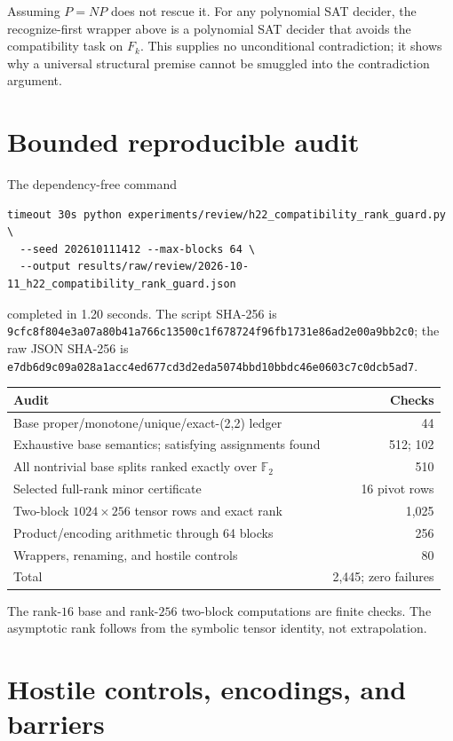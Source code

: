 \documentclass[11pt]{article}
\begin{document}
Assuming $P=NP$ does not rescue it.  For any polynomial SAT decider, the
recognize-first wrapper above is a polynomial SAT decider that avoids the
compatibility task on $F_k$.  This supplies no unconditional contradiction;
it shows why a universal structural premise cannot be smuggled into the
contradiction argument.

\section{Bounded reproducible audit}

The dependency-free command
\begin{verbatim}
timeout 30s python experiments/review/h22_compatibility_rank_guard.py \
  --seed 202610111412 --max-blocks 64 \
  --output results/raw/review/2026-10-11_h22_compatibility_rank_guard.json
\end{verbatim}
completed in 1.20 seconds.  The script SHA-256 is
\nolinkurl{9cfc8f804e3a07a80b41a766c13500c1f678724f96fb1731e86ad2e00a9bb2c0};
the raw JSON SHA-256 is
\nolinkurl{e7db6d9c09a028a1acc4ed677cd3d2eda5074bbd10bbdc46e0603c7c0dcb5ad7}.

\begin{center}
\begin{tabular}{@{}lr@{}}
\toprule
Audit & Checks\\
\midrule
Base proper/monotone/unique/exact-(2,2) ledger & 44\\
Exhaustive base semantics; satisfying assignments found & 512; 102\\
All nontrivial base splits ranked exactly over $\mathbb F_2$ & 510\\
Selected full-rank minor certificate & 16 pivot rows\\
Two-block $1024\times256$ tensor rows and exact rank & 1,025\\
Product/encoding arithmetic through 64 blocks & 256\\
Wrappers, renaming, and hostile controls & 80\\
\midrule
Total & 2,445; zero failures\\
\bottomrule
\end{tabular}
\end{center}

The rank-$16$ base and rank-$256$ two-block computations are finite checks.
The asymptotic rank follows from the symbolic tensor identity, not
extrapolation.

\section{Hostile controls, encodings, and barriers}
\end{document}
